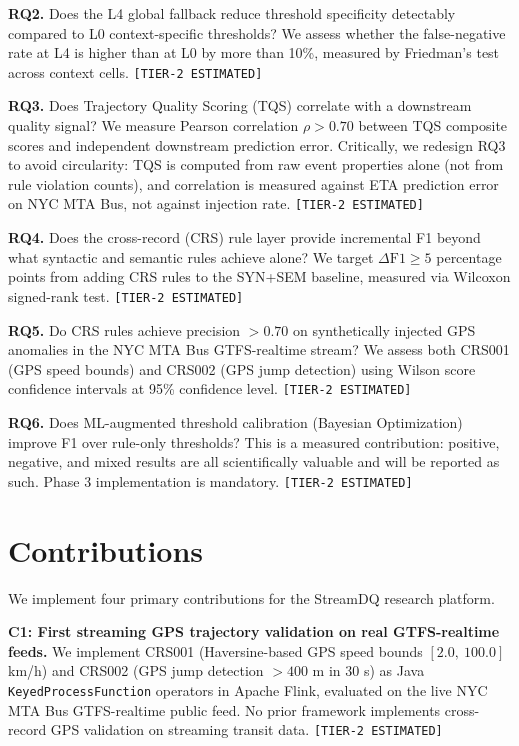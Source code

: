 \textbf{RQ2.} Does the L4 global fallback reduce threshold specificity
detectably compared to L0 context-specific thresholds? We assess whether the
false-negative rate at L4 is higher than at L0 by more than 10\%,
measured by Friedman's test across context cells.
\texttt{[TIER-2\ ESTIMATED]}

\textbf{RQ3.} Does Trajectory Quality Scoring (TQS) correlate with a
downstream quality signal? We measure Pearson correlation $\rho > 0.70$ between
TQS composite scores and independent downstream prediction error. Critically,
we redesign RQ3 to avoid circularity: TQS is computed from raw event properties
alone (not from rule violation counts), and correlation is measured against
ETA prediction error on NYC MTA Bus, not against injection rate.
\texttt{[TIER-2\ ESTIMATED]}

\textbf{RQ4.} Does the cross-record (CRS) rule layer provide incremental F1
beyond what syntactic and semantic rules achieve alone? We target
$\Delta\text{F1} \geq 5$ percentage points from adding CRS rules to the SYN+SEM
baseline, measured via Wilcoxon signed-rank test.
\texttt{[TIER-2\ ESTIMATED]}

\textbf{RQ5.} Do CRS rules achieve precision $> 0.70$ on synthetically injected
GPS anomalies in the NYC MTA Bus GTFS-realtime stream? We assess both CRS001
(GPS speed bounds) and CRS002 (GPS jump detection) using Wilson score confidence
intervals at 95\% confidence level.
\texttt{[TIER-2\ ESTIMATED]}

\textbf{RQ6.} Does ML-augmented threshold calibration (Bayesian Optimization)
improve F1 over rule-only thresholds? This is a measured contribution:
positive, negative, and mixed results are all scientifically valuable and will
be reported as such. Phase 3 implementation is mandatory.
\texttt{[TIER-2\ ESTIMATED]}

\section{Contributions}
\label{sec:intro-contributions}

We implement four primary contributions for the StreamDQ research platform.

\textbf{C1: First streaming GPS trajectory validation on real GTFS-realtime
feeds.} We implement CRS001 (Haversine-based GPS speed bounds $[2.0,\ 100.0]$
km/h) and CRS002 (GPS jump detection $>400$ m in 30 s) as Java
\texttt{KeyedProcessFunction} operators in Apache Flink, evaluated on the live
NYC MTA Bus GTFS-realtime public feed. No prior framework implements cross-record
GPS validation on streaming transit data.
\texttt{[TIER-2\ ESTIMATED]}


